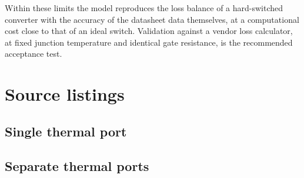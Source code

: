 \documentclass[11pt,a4paper]{article}
\begin{document}
Within these limits the model reproduces the loss balance of a hard-switched
converter with the accuracy of the datasheet data themselves, at a computational
cost close to that of an ideal switch. Validation against a vendor loss
calculator, at fixed junction temperature and identical gate resistance, is the
recommended acceptance test.

\appendix
\section{Source listings}

\subsection{Single thermal port}


\subsection{Separate thermal ports}

\end{document}
